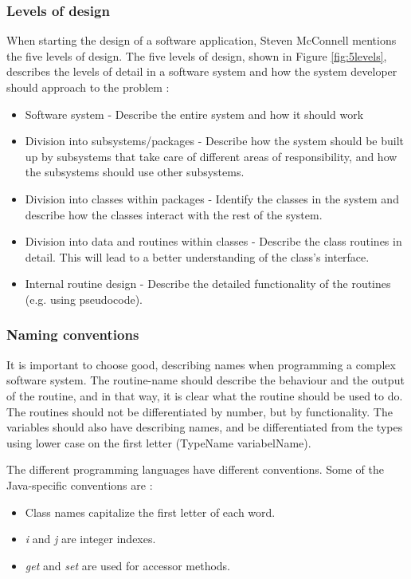 \subsubsection{Levels of design}
\label{sec:levdes}
When starting the design of a software application, Steven McConnell mentions the five levels of design. The five levels of design, shown in Figure \ref{fig:5levels}, describes the levels of detail in a software system and how the system developer should approach to the problem \cite{stevemcconnell2004}:
\begin{itemize}
    \item Software system - Describe the entire system and how it should work
    \item Division into subsystems/packages - Describe how the system should be built up by subsystems that take care of different areas of responsibility, and how the subsystems should use other subsystems.
    \item Division into classes within packages - Identify the classes in the system and describe how the classes interact with the rest of the system.
    \item Division into data and routines within classes - Describe the class routines in detail. This will lead to a better understanding of the class's interface.
    \item Internal routine design - Describe the detailed functionality of the routines (e.g. using pseudocode).
\end{itemize}

\subsubsection{Naming conventions}
\label{sec:nameconv}
It is important to choose good, describing names when programming a complex software system. The routine-name should describe the behaviour and the output of the routine, and in that way, it is clear what the routine should be used to do. The routines should not be differentiated by number, but by functionality. The variables should also have describing names, and be differentiated from the types using lower case on the first letter (TypeName variabelName).

The different programming languages have different conventions. Some of the Java-specific conventions are \cite{stevemcconnell2004}:
\begin{itemize}
    \item Class names capitalize the first letter of each word.
    \item \textit{i} and \textit{j} are integer indexes.
    \item \textit{get} and \textit{set} are used for accessor methods.
\end{itemize}
